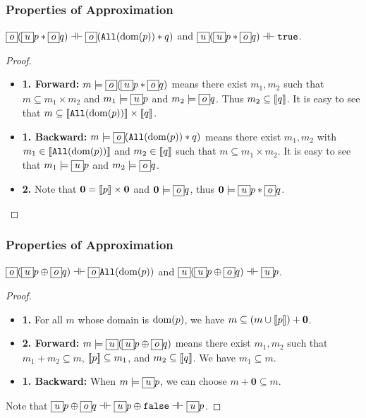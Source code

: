 \begin{frame}[fragile]
    \frametitle{Properties of Approximation}

\begin{lemma}[Mixed $*$] $\boxed{o}(\boxed{u} p * \boxed{o} q) \dashv\vdash \boxed{o} ({\tt All}(\mathrm{dom}(p)) * q)$ and $\boxed{u}(\boxed{u} p * \boxed{o} q) \dashv\vdash {\tt true}$.
\end{lemma}
\begin{proof} 
    \begin{itemize}
        \item \textbf{1. Forward:} $m\models \boxed{o}(\boxed{u} p * \boxed{o} q)$ means there exist $m_1, m_2$ such that $m \subseteq m_1 \times m_2$ and $m_1 \models \boxed{u} p$ and $m_2 \models \boxed{o} q$. Thus $m_2 \subseteq \llbracket {q} \rrbracket$. It is easy to see that $m \subseteq \llbracket {{\tt All}(\mathrm{dom}(p))} \rrbracket \times \llbracket {q} \rrbracket$. 
        \item \textbf{1. Backward:} $m \models \boxed{o} ({\tt All}(\mathrm{dom}(p)) * q)$ means there exist $m_1, m_2$ with $m_1 \in \llbracket {{\tt All}(\mathrm{dom}(p))} \rrbracket$ and $m_2 \in \llbracket {q} \rrbracket$ such that $m \subseteq m_1 \times m_2$. It is easy to see that $m_1 \models \boxed{u} p$ and $m_2 \models \boxed{o} q$.
        \item \textbf{2.} Note that $\textbf{0} = \llbracket {p} \rrbracket \times \textbf{0}$ and $\textbf{0} \models \boxed{o} q$, thus $\textbf{0} \models \boxed{u} p * \boxed{o} q$. 
    \end{itemize}
\end{proof}
\end{frame}

\begin{frame}[fragile]
    \frametitle{Properties of Approximation}

\begin{lemma} $\boxed{o}(\boxed{u} p \oplus \boxed{o} q) \dashv\vdash \boxed{o} {\tt All}(\mathrm{dom}(p))$ and $\boxed{u}(\boxed{u} p \oplus \boxed{o} q) \dashv\vdash \boxed{u} p$.
\end{lemma}
\begin{proof} 
    \begin{itemize}
        \item \textbf{1.} For all $m$ whose domain is $\mathrm{dom}(p)$, we have $m \subseteq (m \cup \llbracket {p} \rrbracket) + \textbf{0}$.
        \item \textbf{2. Forward:} $m\models\boxed{u}(\boxed{u} p \oplus \boxed{o} q)$ means there exist $m_1, m_2$ such that $m_1 + m_2 \subseteq m$, $\llbracket {p} \rrbracket \subseteq m_1$, and $m_2 \subseteq \llbracket {q} \rrbracket$. We have $m_1 \subseteq m$.
        \item \textbf{1. Backward:} When $m\models \boxed{u} p$, we can choose $m + \textbf{0} \subseteq m$.
    \end{itemize}
    Note that $\boxed{u} p \oplus \boxed{o} q \dashv\vdash \boxed{u} p \oplus {\tt false} \dashv\vdash \boxed{u} p$.
\end{proof}

\end{frame}


